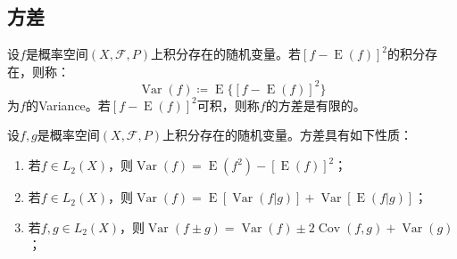 \subsection{方差}
\begin{definition}
	设$f$是概率空间$(X,\mathscr{F},P)$上积分存在的随机变量。若$[f-\operatorname{E}(f)]^2$的积分存在，则称：
	\begin{equation*}
		\operatorname{Var}(f)\coloneq\operatorname{E}\{[f-\operatorname{E}(f)]^2\}
	\end{equation*}
	为$f$的\gls{Variance}。若$[f-\operatorname{E}(f)]^2$可积，则称$f$的方差是有限的。
\end{definition}
\begin{property}\label{prop:Variance}
	设$f,g$是概率空间$(X,\mathscr{F},P)$上积分存在的随机变量。方差具有如下性质：
	\begin{enumerate}
		\item 若$f\in L_2(X)$，则$\operatorname{Var}(f)=\operatorname{E}(f^2)-[\operatorname{E}(f)]^2$；
		\item 若$f\in L_2(X)$，则$\operatorname{Var}(f)=\operatorname{E}[\operatorname{Var}(f|g)]+\operatorname{Var}[\operatorname{E}(f|g)]$；
		\item 若$f,g\in L_2(X)$，则$\operatorname{Var}(f\pm g)=\operatorname{Var}(f)\pm2\operatorname{Cov}(f,g)+\operatorname{Var}(g)$；
	\end{enumerate}
\end{property}
